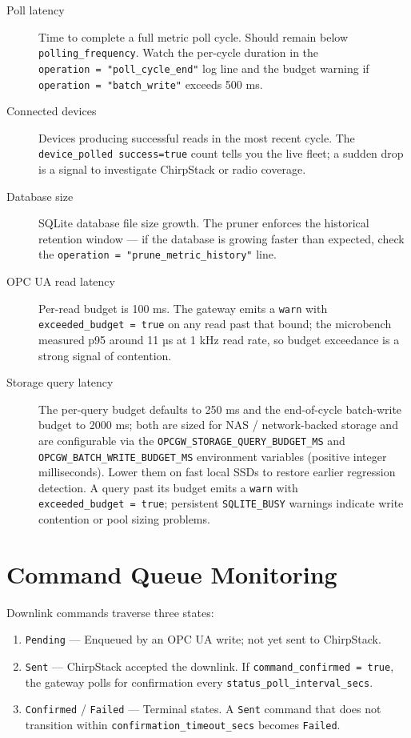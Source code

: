 \begin{description}
\item[Poll latency]
Time to complete a full metric poll cycle. Should remain below \texttt{polling\_frequency}. Watch the per-cycle duration in the \texttt{operation\ =\ "poll\_cycle\_end"} log line and the budget warning if \texttt{operation\ =\ "batch\_write"} exceeds 500 ms.
\item[Connected devices]
Devices producing successful reads in the most recent cycle. The \texttt{device\_polled\ success=true} count tells you the live fleet; a sudden drop is a signal to investigate ChirpStack or radio coverage.
\item[Database size]
SQLite database file size growth. The pruner enforces the historical retention window --- if the database is growing faster than expected, check the \texttt{operation\ =\ "prune\_metric\_history"} line.
\item[OPC UA read latency]
Per-read budget is 100 ms. The gateway emits a \texttt{warn} with \texttt{exceeded\_budget\ =\ true} on any read past that bound; the microbench measured p95 around 11 µs at 1 kHz read rate, so budget exceedance is a strong signal of contention.
\item[Storage query latency]
The per-query budget defaults to 250 ms and the end-of-cycle batch-write budget to 2000 ms; both are sized for NAS / network-backed storage and are configurable via the \texttt{OPCGW\_STORAGE\_QUERY\_BUDGET\_MS} and \texttt{OPCGW\_BATCH\_WRITE\_BUDGET\_MS} environment variables (positive integer milliseconds). Lower them on fast local SSDs to restore earlier regression detection. A query past its budget emits a \texttt{warn} with \texttt{exceeded\_budget\ =\ true}; persistent \texttt{SQLITE\_BUSY} warnings indicate write contention or pool sizing problems.
\end{description}

\section{Command Queue Monitoring}\label{sec-command-monitoring}

Downlink commands traverse three states:

\begin{enumerate}
\def\labelenumi{\arabic{enumi}.}
\item
  \texttt{Pending} --- Enqueued by an OPC UA write; not yet sent to ChirpStack.
\item
  \texttt{Sent} --- ChirpStack accepted the downlink. If \texttt{command\_confirmed\ =\ true}, the gateway polls for confirmation every \texttt{status\_poll\_interval\_secs}.
\item
  \texttt{Confirmed} / \texttt{Failed} --- Terminal states. A \texttt{Sent} command that does not transition within \texttt{confirmation\_timeout\_secs} becomes \texttt{Failed}.
\end{enumerate}

